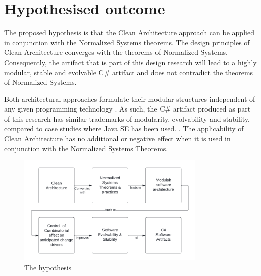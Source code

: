 \section{Hypothesised outcome} \label{hypothesis} 

The proposed hypothesis is that the Clean Architecture approach can be applied in
conjunction with the Normalized Systems theorems. The design principles of Clean
Architecture converges with the theorems of Normalized Systems. Consequently, the artifact
that is part of this design research will lead to a highly modular, stable and evolvable
C\# artifact and does not contradict the theorems of Normalized Systems.

Both architectural approaches formulate their modular structures independent of any given
programming technology \parencite{mannaert_normalized_2009,robert_c_martin_clean_2018}. As such,
the C\# artifact produced as part of this research has similar trademarks of modularity,
evolvability and stability, compared to case studies where Java SE has been used.
\parencite{oorts_building_2014, de_bruyn_enabling_2018}. The applicability of Clean
Architecture has no additional or negative effect when it is used in conjunction with
the Normalized Systems Theorems.

\begin{figure}[H]
    \centering
    \includegraphics[width=0.8\textwidth]{Figures/hypothesis.pdf}
    \caption[The hypothesis]{The hypothesis}
    \label{fig_hypothesis}
\end{figure}